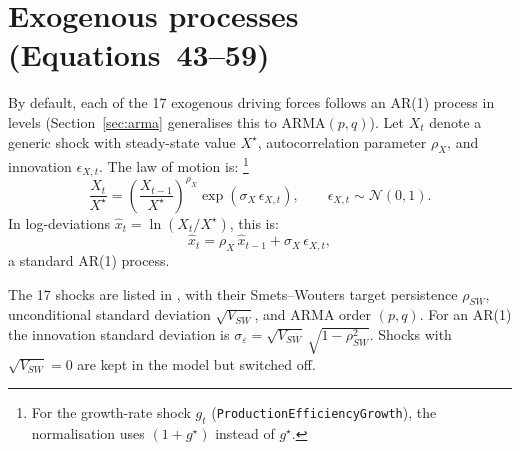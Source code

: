 \documentclass[11pt,a4paper]{article}
\begin{document}
\section{Exogenous processes (Equations~43--59)}
\label{sec:shocks}

By default, each of the 17 exogenous driving forces follows an AR(1)
process in levels (Section~\ref{sec:arma} generalises this to ARMA$(p,q)$).
Let $X_t$ denote a generic shock with steady-state value
$X^{\star}$, autocorrelation parameter $\rho_X$, and innovation
$\epsilon_{X,t}$. The law of motion is:%
\footnote{For the growth-rate shock $g_t$
(\texttt{ProductionEfficiencyGrowth}), the normalisation uses
$(1+g^{\star})$ instead of $g^{\star}$.}
\begin{equation}\label{eq:shock_general}\tag{Eq.~43--59}
  \boxed{
  \frac{X_t}{X^{\star}}
  = \left(\frac{X_{t-1}}{X^{\star}}\right)^{\!\rho_X}
  \exp(\sigma_X\,\epsilon_{X,t}),
  \qquad \epsilon_{X,t} \sim \mathcal{N}(0,1).}
\end{equation}
In log-deviations $\hat x_t = \ln(X_t/X^{\star})$, this is:
\[
  \hat x_t = \rho_X\,\hat x_{t-1} + \sigma_X\,\epsilon_{X,t},
\]
a standard AR(1) process.

\medskip
\noindent The 17 shocks are listed in , with their
Smets--Wouters target persistence $\rho_{SW}$, unconditional standard
deviation $\sqrt{V_{SW}}$, and ARMA order $(p,q)$. For an AR(1) the innovation
standard deviation is $\sigma_\varepsilon = \sqrt{V_{SW}}\,\sqrt{1-\rho_{SW}^2}$.
Shocks with $\sqrt{V_{SW}} = 0$ are kept in the model but switched off.
\end{document}
